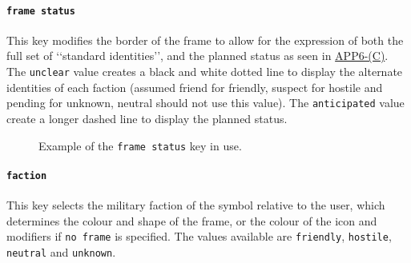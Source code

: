 \documentclass[a4paper, titlepage]{article}
\newcommand\DocLink{\href{https://www.awl.edu.pl/images/en/APP_6_C.pdf}{APP6-(C)}}
\begin{document}
\paragraph{\texttt{frame status}}

This key modifies the border of the frame to allow for the expression of both the full set of \lq\lq{}standard identities\rq\rq{}, and the planned status as seen in \DocLink. The \texttt{unclear} value creates a black and white dotted line to display the alternate identities of each faction (assumed friend for friendly, suspect for hostile and pending for unknown, neutral should not use this value). The \texttt{anticipated} value create a longer dashed line to display the planned status.

\begin{figure}[H]
\centering
{}
\caption{Example of the \texttt{frame status} key in use.}
\end{figure}


\paragraph{\texttt{faction}}

This key selects the military faction of the symbol relative to the user, which determines the colour and shape of the frame, or the colour of the icon and modifiers if \texttt{no frame} is specified. The values available are \texttt{friendly}, \texttt{hostile}, \texttt{neutral} and \texttt{unknown}.
\end{document}
